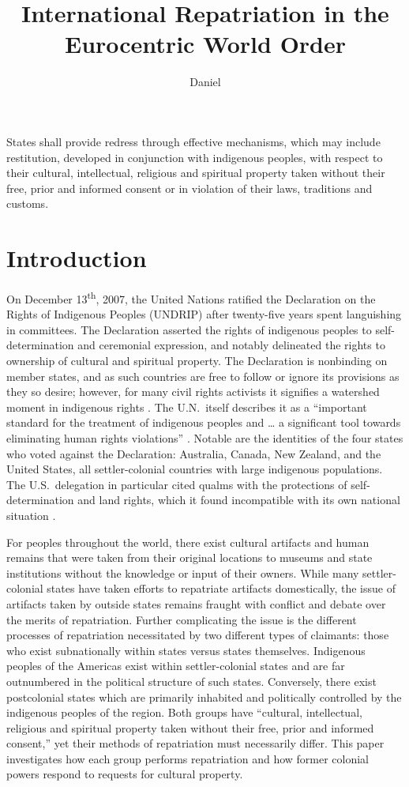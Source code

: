 \documentclass[american]{../../../coursework}
\title{International Repatriation in the Eurocentric World Order}
\subtitle{}
\author{Daniel}{Glenn}{Leonard}
\date{\displaydate{date}}
\begin{document}
\maketitle

\epigraph{States shall provide redress through effective
    mechanisms, which may include restitution, developed in conjunction with
    indigenous peoples, with respect to their cultural, intellectual,
    religious and spiritual property taken without their free, prior and
    informed consent or in violation of their laws, traditions and customs.}
    {\textcite[Article 11, Section 2]{Uni07}}

\section{Introduction}

On December 13\textsuperscript{th}, 2007, the United Nations ratified the
Declaration on the Rights of Indigenous Peoples (UNDRIP) after twenty-five
years spent languishing in committees. The Declaration asserted the rights of
indigenous peoples to self-determination and ceremonial expression, and
notably delineated the rights to ownership of cultural and spiritual property.
The Declaration is nonbinding on member states, and as such countries are free
to follow or ignore its provisions as they so desire; however, for many civil
rights activists it signifies a watershed moment in indigenous rights
\parencite{Wei12}. The U.N.\ itself describes it as a ``important standard for
the treatment of indigenous peoples and … a significant tool towards
eliminating human rights violations'' \parencite[2]{UniFAQ}. Notable are the
identities of the four states who voted against the Declaration: Australia,
Canada, New Zealand, and the United States, all settler-colonial countries
with large indigenous populations. The U.S.\ delegation in particular cited
qualms with the protections of self-determination and land rights, which it
found incompatible with its own national situation \parencite{Uni071}.

For peoples throughout the world, there exist cultural artifacts and human
remains that were taken from their original locations to museums and state
institutions without the knowledge or input of their owners. While many
settler-colonial states have taken efforts to repatriate artifacts
domestically, the issue of artifacts taken by outside states remains fraught
with conflict and debate over the merits of repatriation. Further complicating
the issue is the different processes of repatriation necessitated by two
different types of claimants: those who exist subnationally within states
versus states themselves. Indigenous peoples of the Americas exist within
settler-colonial states and are far outnumbered in the political structure of
such states. Conversely, there exist postcolonial states which are primarily
inhabited and politically controlled by the indigenous peoples of the region.
Both groups have ``cultural, intellectual, religious and spiritual property
taken without their free, prior and informed consent,'' yet their methods of
repatriation must necessarily differ. This paper investigates how each group
performs repatriation and how former colonial powers respond to requests for
cultural property.
\end{document}
